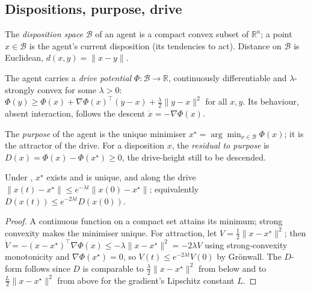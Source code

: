 \documentclass[11pt,twocolumn,a4paper]{article}
\newcommand{\R}{\mathbb{R}}
\newcommand{\Beh}{\mathcal{B}}       %
\newcommand{\Purp}{x^{\star}}        %
\newcommand{\drive}{\Phi}            %
\newcommand{\lam}{\lambda}
\newcommand{\norm}[1]{\lVert#1\rVert}
\newcommand{\dist}{d}
\begin{document}
\subsection{Dispositions, purpose, drive}

\begin{definition}
\label{def:disp}
The \emph{disposition space} $\Beh$ of an agent is a compact convex subset
of $\R^n$; a point $x\in\Beh$ is the agent's current disposition (its
tendencies to act). Distance on $\Beh$ is Euclidean, $\dist(x,y)=
\norm{x-y}$.
\end{definition}

\begin{axiom}
\label{ax:drive}
The agent carries a \emph{drive potential} $\drive:\Beh\to\R$,
continuously differentiable and $\lam$-strongly convex for some $\lam>0$:
$\drive(y)\ge\drive(x)+\nabla\drive(x)^\top(y-x)+\tfrac{\lam}{2}
\norm{y-x}^2$ for all $x,y$. Its behaviour, absent interaction, follows
the descent $\dot x=-\nabla\drive(x)$.
\end{axiom}

\begin{definition}[Purpose]
\label{def:purpose}
The \emph{purpose} of the agent is the unique minimiser
$\Purp=\arg\min_{x\in\Beh}\drive(x)$; it is the attractor of the drive.
For a disposition $x$, the \emph{residual to purpose} is
$D(x)=\drive(x)-\drive(\Purp)\ge0$, the drive-height still to be
descended.
\end{definition}

\begin{lemma}
\label{lem:purpose}
Under , $\Purp$ exists and is unique, and along the drive
$\norm{x(t)-\Purp}\le e^{-\lam t}\norm{x(0)-\Purp}$; equivalently
$D(x(t))\le e^{-2\lam t}D(x(0))$.
\end{lemma}

\begin{proof}
A continuous function on a compact set attains its minimum; strong
convexity makes the minimiser unique. For attraction, let
$V=\tfrac12\norm{x-\Purp}^2$; then $\dot V=-(x-\Purp)^\top\nabla\drive(x)
\le-\lam\norm{x-\Purp}^2=-2\lam V$ using strong-convexity monotonicity and
$\nabla\drive(\Purp)=0$, so $V(t)\le e^{-2\lam t}V(0)$ by Grönwall. The
$D$-form follows since $D$ is comparable to $\tfrac{\lam}{2}\norm{x-\Purp}^2$
from below and to $\tfrac{L}{2}\norm{x-\Purp}^2$ from above for the
gradient's Lipschitz constant $L$.
\end{proof}
\end{document}
